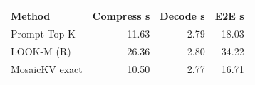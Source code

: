 \begin{tabular}{lrrr}
\toprule
Method & Compress s & Decode s & E2E s\\\midrule
Prompt Top-K & 11.63 & 2.79 & 18.03\\
LOOK-M (R) & 26.36 & 2.80 & 34.22\\
MosaicKV exact & 10.50 & 2.77 & 16.71\\
\bottomrule
\end{tabular}
